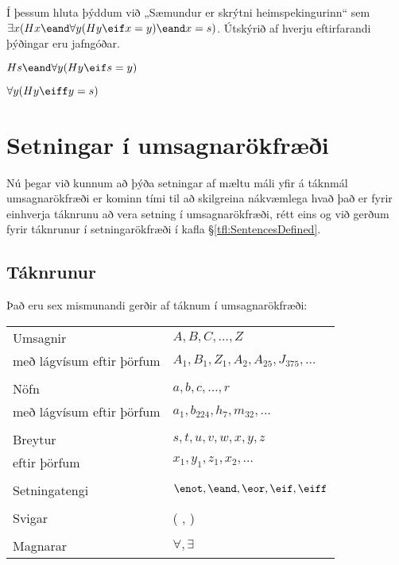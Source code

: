 \problempart
Í þessum hluta þýddum við „Sæmundur er skrýtni heimspekingurinn“ sem $\exists x (Hx \eand \forall y(Hy \eif x = y) \eand x = s)$. Útskýrið af hverju eftirfarandi þýðingar eru jafngóðar.
	\begin{ebullet}
		\item $Hs \eand \forall y(Hy \eif s = y)$
		\item $\forall y(Hy \eiff y = s)$
	\end{ebullet}


\chapter{Setningar í umsagnarökfræði}\label{s:FOLSentences}

Nú þegar við kunnum að þýða setningar af mæltu máli yfir á táknmál umsagnarökfræði er kominn tími til að skilgreina nákvæmlega hvað það er fyrir einhverja táknrunu að vera setning í umsagnarökfræði, rétt eins og við gerðum fyrir táknrunur í setningarökfræði í kafla \S \ref{tfl:SentencesDefined}.


\section{Táknrunur}
Það eru sex mismunandi gerðir af táknum í umsagnarökfræði:

\begin{center}
\begin{tabular}{l l}
Umsagnir & $A,B,C,\ldots,Z$\\
með lágvísum eftir þörfum & $A_1, B_1,Z_1,A_2,A_{25},J_{375},\ldots$\\
\\
Nöfn & $a,b,c,\ldots, r$\\
með lágvísum eftir þörfum & $a_1, b_{224}, h_7, m_{32},\ldots$\\
\\
Breytur & $s, t, u, v, w, x,y,z$\\
eftir þörfum & $x_1, y_1, z_1, x_2,\ldots$\\
\\
Setningatengi & $\enot,\eand,\eor,\eif,\eiff$\\
\\
Svigar &( , )\\
\\
Magnarar & $\forall, \exists$\\
\end{tabular}
\end{center}

